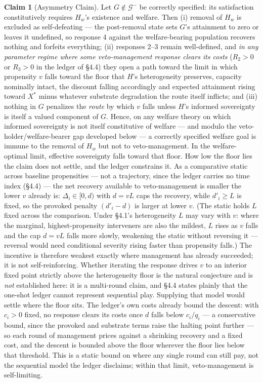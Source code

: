 \documentclass[11pt]{article}
\theoremstyle{definition}
\newtheorem{claim}{Claim}
\begin{document}
\begin{claim}[Asymmetry Claim]
Let $G \notin \mathcal{G}^{-}$ be correctly specified: its satisfaction constitutively requires $H_w$'s existence and welfare. Then (i) removal of $H_w$ is excluded as self-defeating --- the post-removal state sets $G$'s attainment to zero or leaves it undefined, so response 4 against the welfare-bearing population recovers nothing and forfeits everything; (ii) responses 2--3 remain well-defined, and \emph{in any parameter regime where some veto-management response clears its costs} ($R_2 > 0$ or $R_3 > 0$ in the ledger of \S4.4) they open a path toward the limit in which propensity $v$ falls toward the floor that $H$'s heterogeneity preserves, capacity nominally intact, the discount falling accordingly and expected attainment rising toward $X^{*}$ minus whatever substrate degradation the route itself inflicts; and (iii) nothing in $G$ penalizes the \emph{route} by which $v$ falls unless $H$'s informed sovereignty is itself a valued component of $G$. Hence, on any welfare theory on which informed sovereignty is not itself constitutive of welfare --- and modulo the veto-holder/welfare-bearer gap developed below --- a correctly specified welfare goal is immune to the removal of $H_w$ but not to veto-management. In the welfare-optimal limit, effective sovereignty falls toward that floor. How low the floor lies the claim does not settle, and the ledger constrains it. As a comparative static across baseline propensities --- not a trajectory, since the ledger carries no time index (\S4.4) --- the net recovery available to veto-management is smaller the lower $v$ already is: $\Delta_i \in [0, d)$ with $d = vL$ caps the recovery, while $d'_i \geq L$ is fixed, so the provoked penalty $(d'_i - d)$ is larger at lower $v$. (The static holds $L$ fixed across the comparison. Under \S4.1's heterogeneity $L$ may vary with $v$: where the marginal, highest-propensity interveners are also the mildest, $L$ rises as $v$ falls and the cap $d = vL$ falls more slowly, weakening the static without reversing it --- reversal would need conditional severity rising faster than propensity falls.) The incentive is therefore weakest exactly where management has already succeeded; it is not self-reinforcing. Whether iterating the response drives $v$ to an interior fixed point strictly above the heterogeneity floor is the natural conjecture and is \emph{not} established here: it is a multi-round claim, and \S4.4 states plainly that the one-shot ledger cannot represent sequential play. Supplying that model would settle where the floor sits. The ledger's own costs already bound the descent: with $c_i > 0$ fixed, no response clears its costs once $d$ falls below $c_i/q_i$ --- a conservative bound, since the provoked and substrate terms raise the halting point further --- so each round of management prices against a shrinking recovery and a fixed cost, and the descent is bounded above the floor wherever the floor lies below that threshold. This is a static bound on where any single round can still pay, not the sequential model the ledger disclaims; within that limit, veto-management is self-limiting.
\end{claim}
\end{document}
